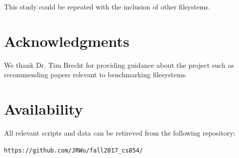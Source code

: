 \documentclass[letterpaper,twocolumn,10pt]{article}
\begin{document}
This study could be repeated with the inclusion of other filsystems. 

\section{Acknowledgments}
We thank Dr. Tim Brecht for providing guidance about the project such as recommending papers relevant to benchmarking filesystems. 

\section{Availability}\label{Availability}
All relevant scripts and data can be retireved from the following repository:
\begin{center}
{\tt https://github.com/JRWu/fall2017\_cs854/}
\end{center}

{\footnotesize 

\theendnotes

\newpage
}
\end{document}
